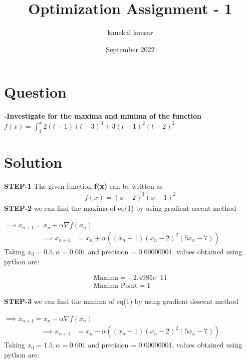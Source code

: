 \documentclass[journal,12pt,twocolumn]{IEEEtran}
\title{\textbf{Optimization Assignment - 1}}
\author{kanekal kousar}
\date{September 2022}
\providecommand{\brak}[1]{\ensuremath{\left(#1\right)}}
\begin{document}
\maketitle

\section{Question}
\textbf{-Investigate for the maxima and minima of the function
 $f(x)=\int_{1}^{x}2(t-1)(t-3)^3+3(t-1)^2(t-2)^2$}
 
 \section{Solution}
 \textbf{STEP-1}
 The given function \textbf{f(x)} can be written as
 \begin{align}
 f(x)=(x-2)^3(x-1)^2
 \end{align}
 \textbf{STEP-2}
 we can find the maxima of eq(1) by using gradient ascent method
 
$\implies x_{n+1} = x_n + \alpha \nabla f(x_n) $\\
 \begin{align}
        \implies x_{n+1} &= x_n + \alpha \brak{(x_n-1)(x_n-2)^2(5x_n-7)}
    \end{align}
 Taking $x_0=0.5,\alpha=0.001$ and precision = 0.00000001, values obtained using python are:
    
    \begin{align}
        \boxed{\text{Maxima} = -2.4985e^-11}\\
        \boxed{\text{Maxima Point} = 1}
    \end{align}
 
 \textbf{STEP-3}
 we can find the minima of eq(1) by using gradient descent method
 
$\implies x_{n+1} = x_n - \alpha \nabla f(x_n) $\\
 \begin{align}
        \implies x_{n+1} &= x_n - \alpha \brak{(x_n-1)(x_n-2)^2(5x_n-7)}
    \end{align}
Taking $x_0=1.5,\alpha=0.001$ and precision = 0.00000001, values obtained using python are:
    
\end{document}
